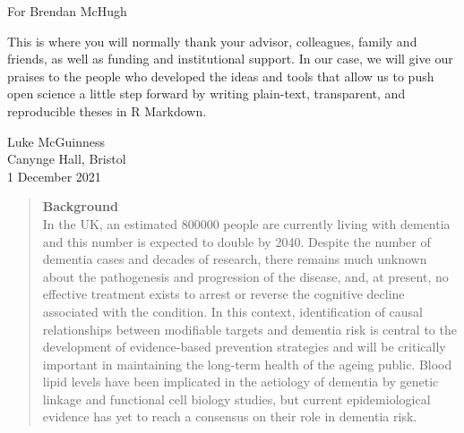 \documentclass[a4paper, nobind]{templates/ociamthesis}
\begin{document}
\begin{romanpages}

\maketitle

\begin{dedication}
  For Brendan McHugh
\end{dedication}

\begin{acknowledgements}
 	This is where you will normally thank your advisor, colleagues, family and friends, as well as funding and institutional support. In our case, we will give our praises to the people who developed the ideas and tools that allow us to push open science a little step forward by writing plain-text, transparent, and reproducible theses in R Markdown.

\begin{flushright}
Luke McGuinness \\
Canynge Hall, Bristol \\
1 December 2021
\end{flushright}
\end{acknowledgements}


\begin{abstract}
	\textbf{Background}\\
In the UK, an estimated 800000 people are currently living with dementia and this number is expected to double
by 2040. Despite the number of dementia cases and decades of research, there remains much unknown about
the pathogenesis and progression of the disease, and, at present, no effective treatment exists to arrest or
reverse the cognitive decline associated with the condition. In this context, identification of causal relationships
between modifiable targets and dementia risk is central to the development of evidence-based prevention
strategies and will be critically important in maintaining the long-term health of the ageing public. Blood lipid
levels have been implicated in the aetiology of dementia by genetic linkage and functional cell biology studies,
but current epidemiological evidence has yet to reach a consensus on their role in dementia risk.
\end{abstract}


\end{romanpages}
\end{document}
